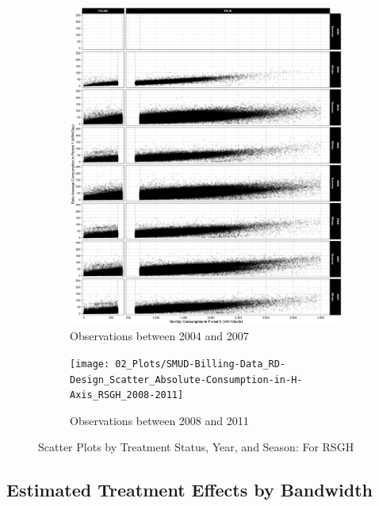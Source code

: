 \clearpage
\begin{figure}
    \begin{subfigure}{1.0\textwidth}
        \centering
        \includegraphics[scale = 0.12]{02_Plots/SMUD-Billing-Data_RD-Design_Scatter_Absolute-Consumption-in-H-Axis_RSGH_2004-2007}
        \caption{Observations between 2004 and 2007}
    \end{subfigure}
    \begin{subfigure}{1.0\textwidth}
        \centering
        \texttt{[image: 02\_Plots/SMUD-Billing-Data\_RD-Design\_Scatter\_Absolute-Consumption-in-H-Axis\_RSGH\_2008-2011]}
        \caption{Observations between 2008 and 2011}
    \end{subfigure}
    \caption{Scatter Plots by Treatment Status, Year, and Season: For RSGH}
    \label{Figure:Scatter-Plots_RSGH_2004-2007}
\end{figure}


\clearpage
\subsection{Estimated Treatment Effects by Bandwidth}

